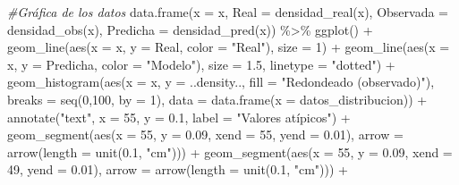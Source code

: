 \documentclass[
]{article}
\newenvironment{Shaded}{\begin{snugshade}}{\end{snugshade}}
\newcommand{\AttributeTok}[1]{\textcolor[rgb]{0.77,0.63,0.00}{#1}}
\newcommand{\CommentTok}[1]{\textcolor[rgb]{0.56,0.35,0.01}{\textit{#1}}}
\newcommand{\DecValTok}[1]{\textcolor[rgb]{0.00,0.00,0.81}{#1}}
\newcommand{\FloatTok}[1]{\textcolor[rgb]{0.00,0.00,0.81}{#1}}
\newcommand{\FunctionTok}[1]{\textcolor[rgb]{0.00,0.00,0.00}{#1}}
\newcommand{\NormalTok}[1]{#1}
\newcommand{\SpecialCharTok}[1]{\textcolor[rgb]{0.00,0.00,0.00}{#1}}
\newcommand{\StringTok}[1]{\textcolor[rgb]{0.31,0.60,0.02}{#1}}
\begin{document}
\begin{Shaded}
\begin{Highlighting}[]
\CommentTok{\#Gráfica de los datos}
\FunctionTok{data.frame}\NormalTok{(}\AttributeTok{x =}\NormalTok{ x, }\AttributeTok{Real =} \FunctionTok{densidad\_real}\NormalTok{(x), }\AttributeTok{Observada =} \FunctionTok{densidad\_obs}\NormalTok{(x), }
           \AttributeTok{Predicha =} \FunctionTok{densidad\_pred}\NormalTok{(x)) }\SpecialCharTok{\%\textgreater{}\%}
\FunctionTok{ggplot}\NormalTok{() }\SpecialCharTok{+}
  \FunctionTok{geom\_line}\NormalTok{(}\FunctionTok{aes}\NormalTok{(}\AttributeTok{x =}\NormalTok{ x, }\AttributeTok{y =}\NormalTok{ Real, }\AttributeTok{color =} \StringTok{"Real"}\NormalTok{), }\AttributeTok{size =} \DecValTok{1}\NormalTok{) }\SpecialCharTok{+}
  \FunctionTok{geom\_line}\NormalTok{(}\FunctionTok{aes}\NormalTok{(}\AttributeTok{x =}\NormalTok{ x, }\AttributeTok{y =}\NormalTok{ Predicha, }\AttributeTok{color =} \StringTok{"Modelo"}\NormalTok{), }\AttributeTok{size =} \FloatTok{1.5}\NormalTok{,}
            \AttributeTok{linetype =} \StringTok{"dotted"}\NormalTok{) }\SpecialCharTok{+}
  \FunctionTok{geom\_histogram}\NormalTok{(}\FunctionTok{aes}\NormalTok{(}\AttributeTok{x =}\NormalTok{ x, }\AttributeTok{y =}\NormalTok{ ..density.., }\AttributeTok{fill =} \StringTok{"Redondeado (observado)"}\NormalTok{),}
                 \AttributeTok{breaks =} \FunctionTok{seq}\NormalTok{(}\DecValTok{0}\NormalTok{,}\DecValTok{100}\NormalTok{, }\AttributeTok{by =} \DecValTok{1}\NormalTok{), }
                 \AttributeTok{data =} \FunctionTok{data.frame}\NormalTok{(}\AttributeTok{x =}\NormalTok{ datos\_distribucion)) }\SpecialCharTok{+}
  \FunctionTok{annotate}\NormalTok{(}\StringTok{"text"}\NormalTok{, }\AttributeTok{x =} \DecValTok{55}\NormalTok{, }\AttributeTok{y =} \FloatTok{0.1}\NormalTok{, }\AttributeTok{label =} \StringTok{"Valores atípicos"}\NormalTok{) }\SpecialCharTok{+}
  \FunctionTok{geom\_segment}\NormalTok{(}\FunctionTok{aes}\NormalTok{(}\AttributeTok{x =} \DecValTok{55}\NormalTok{, }\AttributeTok{y =} \FloatTok{0.09}\NormalTok{, }\AttributeTok{xend =} \DecValTok{55}\NormalTok{, }\AttributeTok{yend =} \FloatTok{0.01}\NormalTok{),}
               \AttributeTok{arrow =} \FunctionTok{arrow}\NormalTok{(}\AttributeTok{length =} \FunctionTok{unit}\NormalTok{(}\FloatTok{0.1}\NormalTok{, }\StringTok{"cm"}\NormalTok{))) }\SpecialCharTok{+}
  \FunctionTok{geom\_segment}\NormalTok{(}\FunctionTok{aes}\NormalTok{(}\AttributeTok{x =} \DecValTok{55}\NormalTok{, }\AttributeTok{y =} \FloatTok{0.09}\NormalTok{, }\AttributeTok{xend =} \DecValTok{49}\NormalTok{, }\AttributeTok{yend =} \FloatTok{0.01}\NormalTok{),}
               \AttributeTok{arrow =} \FunctionTok{arrow}\NormalTok{(}\AttributeTok{length =} \FunctionTok{unit}\NormalTok{(}\FloatTok{0.1}\NormalTok{, }\StringTok{"cm"}\NormalTok{))) }\SpecialCharTok{+}

\end{Highlighting}
\end{Shaded}
\end{document}
